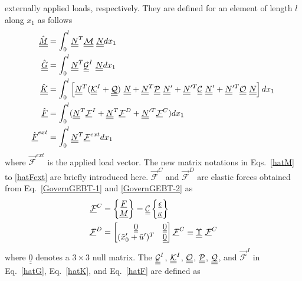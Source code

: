 externally applied loads, respectively. They are defined for an element of length $l$ along $x_1$ as follows
\begin{align}
	\label{hatM} 
	\hat{\underline{\underline{M}}}&= \int_0^l \underline{\underline{N}}^T \mathcal{\underline{\underline{M}}} ~\underline{\underline{N}} dx_1 \\
	\label{hatG}
	\hat{\underline{\underline{G}}} &= \int_0^l \underline{\underline{N}}^T \underline{\underline{\mathcal{G}}}^I~\underline{\underline{N}} dx_1\\ 
	\label{hatK}
	\hat{\underline{\underline{K}}}&=\int_0^l \left[ \underline{\underline{N}}^T (\underline{\underline{\mathcal{K}}}^I + \mathcal{\underline{\underline{Q}}})~ \underline{\underline{N}} + \underline{\underline{N}}^T \mathcal{\underline{\underline{P}}}~ \underline{\underline{N}}^\prime + \underline{\underline{N}}^{\prime T} \mathcal{\underline{\underline{C}}}~ \underline{\underline{N}}^\prime + \underline{\underline{N}}^{\prime T} \mathcal{\underline{\underline{O}}}~ \underline{\underline{N}} \right] d x_1 \\	
	\label{hatF}
	\hat{\underline{F}} &= \int_0^l (\underline{\underline{N}}^T \underline{\mathcal{F}}^I + \underline{\underline{N}}^T \mathcal{\underline{F}}^D + \underline{\underline{N}}^{\prime T} \mathcal{\underline{F}}^C)dx_1 \\
	\label{hatFext}
	\hat{\underline{F}}^{ext}& = \int_0^l \underline{\underline{N}}^T \mathcal{\underline{F}}^{ext} dx_1 
\end{align}
where $\mathcal{\vec{F}}^{ext}$ is the applied load vector. The new matrix notations in Eqs.~\eqref{hatM} to \eqref{hatFext} are briefly
introduced here. $\mathcal{\vec{F}}^C$ and $\mathcal{\vec{F}}^D$ are
elastic forces obtained from Eq.~\eqref{GovernGEBT-1} and
\eqref{GovernGEBT-2} as
\begin{align}
	\label{FC}
	\mathcal{\underline{F}}^C &= \begin{Bmatrix}
         \underline{F} \\
	\underline{M}
	\end{Bmatrix} = \underline{\underline{\mathcal{C}}} \begin{Bmatrix}
	\underline{\epsilon} \\
	\underline{\kappa}
	\end{Bmatrix} \\
	\label{FD}
	\mathcal{\underline{F}}^D & = \begin{bmatrix}
	\underline{\underline{0}} & \underline{\underline{0}}\\
	(\tilde{x}_0^\prime+\tilde{u}^\prime)^T & \underline{\underline{0}}
	\end{bmatrix}
	\mathcal{\underline{F}}^C \equiv \underline{\underline{\Upsilon}}~ \mathcal{\underline{F}}^C
\end{align}
where $\underline{\underline{0}}$ denotes a $3 \times 3$ null matrix. The $\underline{\underline{\mathcal{G}}}^I$, $\underline{\underline{\mathcal{K}}}^I$,  $\mathcal{\underline{\underline{O}}}$, $\mathcal{\underline{\underline{P}}}$, $\mathcal{\underline{\underline{Q}}}$, and $\vec{\mathcal{F}}^I$ in Eq.~\eqref{hatG}, Eq.~\eqref{hatK}, and Eq.~\eqref{hatF} are defined as
